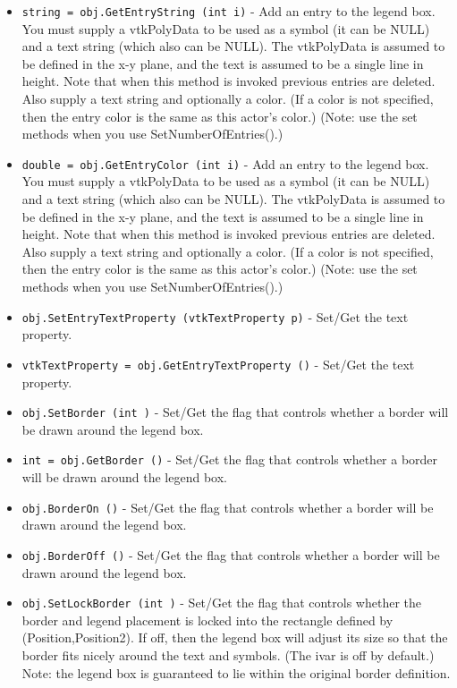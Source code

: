 \begin{itemize}
\item  \verb|string = obj.GetEntryString (int i)| -  Add an entry to the legend box. You must supply a vtkPolyData to be
 used as a symbol (it can be NULL) and a text string (which also can
 be NULL). The vtkPolyData is assumed to be defined in the x-y plane,
 and the text is assumed to be a single line in height. Note that when
 this method is invoked previous entries are deleted. Also supply a text
 string and optionally a color. (If a color is not specified, then the
 entry color is the same as this actor's color.) (Note: use the set
 methods when you use SetNumberOfEntries().)

\item  \verb|double = obj.GetEntryColor (int i)| -  Add an entry to the legend box. You must supply a vtkPolyData to be
 used as a symbol (it can be NULL) and a text string (which also can
 be NULL). The vtkPolyData is assumed to be defined in the x-y plane,
 and the text is assumed to be a single line in height. Note that when
 this method is invoked previous entries are deleted. Also supply a text
 string and optionally a color. (If a color is not specified, then the
 entry color is the same as this actor's color.) (Note: use the set
 methods when you use SetNumberOfEntries().)

\item  \verb|obj.SetEntryTextProperty (vtkTextProperty p)| -  Set/Get the text property.

\item  \verb|vtkTextProperty = obj.GetEntryTextProperty ()| -  Set/Get the text property.

\item  \verb|obj.SetBorder (int )| -  Set/Get the flag that controls whether a border will be drawn
 around the legend box.

\item  \verb|int = obj.GetBorder ()| -  Set/Get the flag that controls whether a border will be drawn
 around the legend box.

\item  \verb|obj.BorderOn ()| -  Set/Get the flag that controls whether a border will be drawn
 around the legend box.

\item  \verb|obj.BorderOff ()| -  Set/Get the flag that controls whether a border will be drawn
 around the legend box.

\item  \verb|obj.SetLockBorder (int )| -  Set/Get the flag that controls whether the border and legend
 placement is locked into the rectangle defined by (Position,Position2).
 If off, then the legend box will adjust its size so that the border
 fits nicely around the text and symbols. (The ivar is off by default.)
 Note: the legend box is guaranteed to lie within the original border
 definition.


\end{itemize}
